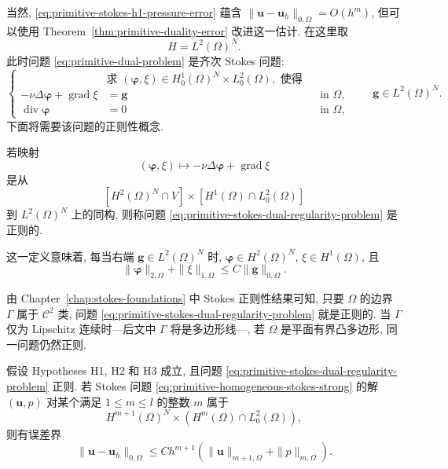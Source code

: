 当然, \eqref{eq:primitive-stokes-h1-pressure-error} 蕴含
$\|\mathbf u-\mathbf u_h\|_{0,\Omega}=O(h^m)$, 但可以使用
Theorem~\ref{thm:primitive-duality-error} 改进这一估计. 在这里取
\[
H=L^2(\Omega)^N.
\]
此时问题 \eqref{eq:primitive-dual-problem} 是齐次 Stokes 问题:
\begin{equation}\label{eq:primitive-stokes-dual-regularity-problem}
\left\{
\begin{aligned}
&\text{求 }(\boldsymbol\varphi,\xi)
\in H_0^1(\Omega)^N\times L_0^2(\Omega),\text{ 使得}\\
-\nu\Delta\boldsymbol\varphi+\operatorname{grad}\xi&=\mathbf g
&&\text{in }\Omega,\\
\operatorname{div}\boldsymbol\varphi&=0
&&\text{in }\Omega,
\end{aligned}
\right.
\qquad \mathbf g\in L^2(\Omega)^N.
\end{equation}
下面将需要该问题的正则性概念.

\setcounter{statement}{0}
\begin{Definition}\label{def:primitive-stokes-regularity}
若映射
\[
(\boldsymbol\varphi,\xi)
\longmapsto-\nu\Delta\boldsymbol\varphi+\operatorname{grad}\xi
\]
是从
\[
[H^2(\Omega)^N\cap V]
\times[H^1(\Omega)\cap L_0^2(\Omega)]
\]
到 $L^2(\Omega)^N$ 上的同构, 则称问题
\eqref{eq:primitive-stokes-dual-regularity-problem} 是正则的.
\end{Definition}

这一定义意味着, 每当右端 $\mathbf g\in L^2(\Omega)^N$ 时,
$\boldsymbol\varphi\in H^2(\Omega)^N$, $\xi\in H^1(\Omega)$, 且
\begin{equation}\label{eq:primitive-stokes-regularity-estimate}
\|\boldsymbol\varphi\|_{2,\Omega}+\|\xi\|_{1,\Omega}
\leq C\|\mathbf g\|_{0,\Omega}.
\end{equation}

由 Chapter~\ref{chap:stokes-foundations} 中 Stokes 正则性结果可知,
只要 $\Omega$ 的边界 $\Gamma$ 属于 $\mathcal C^2$ 类, 问题
\eqref{eq:primitive-stokes-dual-regularity-problem} 就是正则的.
当 $\Gamma$ 仅为 Lipschitz 连续时---后文中 $\Gamma$ 将是多边形线---,
若 $\Omega$ 是平面有界凸多边形, 同一问题仍然正则.

\setcounter{statement}{8}
\begin{Theorem}\label{thm:primitive-stokes-l2-error}
假设 Hypotheses H1, H2 和 H3 成立, 且问题
\eqref{eq:primitive-stokes-dual-regularity-problem} 正则. 若 Stokes 问题
\eqref{eq:primitive-homogeneous-stokes-strong} 的解 $(\mathbf u,p)$ 对某个满足
$1\leq m\leq l$ 的整数 $m$ 属于
\[
H^{m+1}(\Omega)^N\times(H^m(\Omega)\cap L_0^2(\Omega)),
\]
则有误差界
\begin{equation}\label{eq:primitive-stokes-l2-error}
\|\mathbf u-\mathbf u_h\|_{0,\Omega}
\leq Ch^{m+1}\left(
\|\mathbf u\|_{m+1,\Omega}+\|p\|_{m,\Omega}
\right).
\end{equation}
\end{Theorem}

